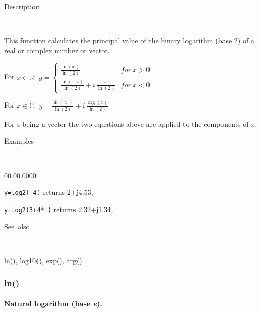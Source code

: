 \begin{description}
\item [Description]~
\end{description}
This function calculates the principal value of the binary logarithm
(base 2) of a real or complex number or vector.

\medskip{}
For $x\in\mathbb{R}$: $y=\left\{ \begin{array}{cc}
{\displaystyle \frac{\ln\left(x\right)}{\ln\left(2\right)}} & for\: x>0\\
{\displaystyle \frac{\ln\left(-x\right)}{\ln\left(2\right)}}+i\,{\displaystyle \frac{\pi}{\ln\left(2\right)}} & for\: x<0\end{array}\right.$

\medskip{}
For $x\in\mathbb{C}$: $y={\displaystyle \frac{\ln\left(\left|x\right|\right)}{\ln\left(2\right)}}+i\,{\displaystyle \frac{\arg\left(x\right)}{\ln\left(2\right)}}$
\medskip{}

For \textit{x} being a vector the two equations above are
applied to the components of \textit{x}.

\begin{description}
\item [Examples]~
\end{description}
\begin{lyxlist}{00.00.0000}
\item [\texttt{y=log2(-4)}]returns 2+j4.53,
\item [\texttt{y=log2(3+4{*}i)}]returns 2.32+j1.34.
\end{lyxlist}
\begin{description}
\item [See~also]~
\end{description}
\textcolor{blue}{\hyperlink{ln}{ln()}}\textcolor{black}{,}
\textcolor{blue}{\hyperlink{log10}{log10()}}\textcolor{black}{,}
\textcolor{blue}{\hyperlink{exp}{exp()}}\textcolor{black}{,} \textcolor{blue}{\hyperlink{arg}{arg()}}


\newpage
\subsubsection*{\hypertarget{ln}{}{\Large ln()}}


\paragraph{\label{par:Natural-logarithm}Natural logarithm (base \textit{e}).}

